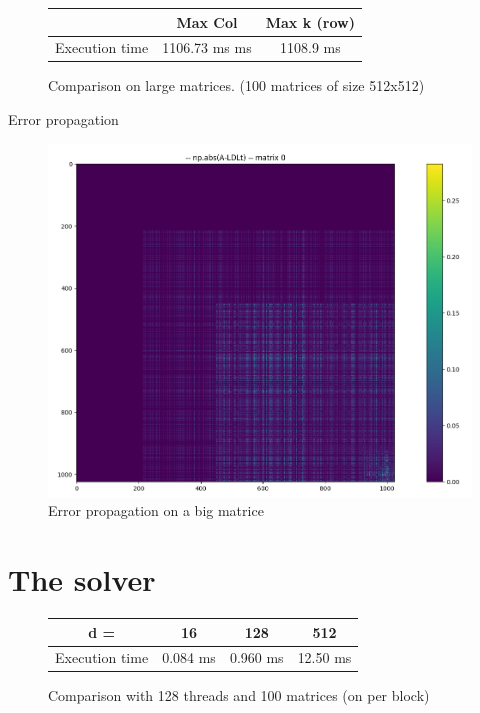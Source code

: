 \documentclass[compress,xcolor=table]{beamer}
\begin{document}
\begin{frame}{}
	
	\begin{figure}
		\begin{tabular}{c|c|c}
			& Max Col & Max k (row) 
			\\
			\hline
			Execution time &  1106.73 ms ms & 1108.9 ms \\
		\end{tabular}
		
		\caption{Comparison on large matrices. (100 matrices of size 512x512)}
	\end{figure}
	
\end{frame}

\begin{frame}{Error propagation}
	\begin{figure}
		\centering
		\includegraphics[scale=0.3]{images/bigerrors.png}
		\caption{Error propagation on a big matrice}
	\end{figure}
\end{frame}

\section{The solver}

\begin{frame}{}
	
	\begin{figure}
		\begin{tabular}{c|c|c|c}
			d = & 16 & 128 & 512  
			\\
			\hline
			Execution time &  0.084 ms & 0.960 ms &  12.50 ms \\
		\end{tabular}
		
		\caption{Comparison with 128 threads and 100 matrices (on per block)}
	\end{figure}
	
\end{frame}
\end{document}
